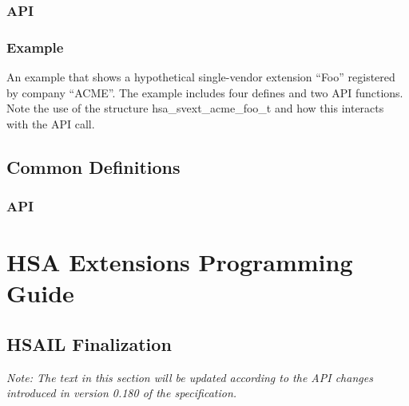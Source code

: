 \documentclass[final]{book}
\newcommand{\reftyp}[1]{#1}
\begin{document}
\subsection{API}


\subsection{Example}
An example that shows a hypothetical single-vendor extension ``Foo'' registered
by company ``ACME''. The example includes four defines and two API functions.
Note the use of the structure \reftyp{hsa_svext_acme_foo_t} and how this
interacts with the  API call.



\section{Common Definitions}\label{sec:other}
\subsection{API}

%


\chapter{HSA Extensions Programming Guide}

\section{HSAIL Finalization}\label{finalizerchapter}

\emph{Note: The text in this section will be updated according to the API
  changes introduced in version 0.180 of the specification.}



\end{document}
